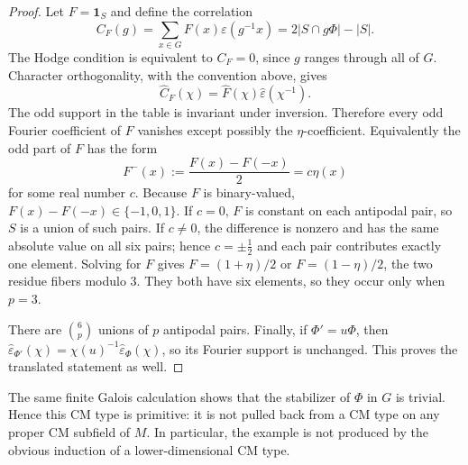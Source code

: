 \begin{proof}
Let $F=\mathbf1_S$ and define the correlation
\[
 C_F(g)=\sum_{x\in G}F(x)\varepsilon(g^{-1}x)
       =2|S\cap g\Phi|-|S|.
\]
The Hodge condition is equivalent to $C_F=0$, since $g$ ranges through all
of $G$.  Character orthogonality, with the convention above, gives
\[
 \widehat C_F(\chi)=\widehat F(\chi)
                    \widehat\varepsilon(\chi^{-1}).
\]
The odd support in the table is invariant under inversion.  Therefore every
odd Fourier coefficient of $F$ vanishes except possibly the $\eta$-coefficient.
Equivalently the odd part of $F$ has the form
\[
 F^-(x):=\frac{F(x)-F(-x)}2=c\eta(x)
\]
for some real number $c$.  Because $F$ is binary-valued,
$F(x)-F(-x)\in\{-1,0,1\}$.  If $c=0$, $F$ is constant on each antipodal
pair, so $S$ is a union of such pairs.  If $c\ne0$, the difference is nonzero
and has the same absolute value on all six pairs; hence $c=\pm\tfrac12$ and
each pair contributes exactly one element.  Solving for $F$ gives
$F=(1+\eta)/2$ or $F=(1-\eta)/2$, the two residue fibers modulo $3$.
They both have six elements, so they occur only when $p=3$.

There are $\binom6p$ unions of $p$ antipodal pairs.  Finally, if
$\Phi'=u\Phi$, then
$\widehat\varepsilon_{\Phi'}(\chi)=\chi(u)^{-1}
\widehat\varepsilon_\Phi(\chi)$, so its Fourier support is unchanged.  This
proves the translated statement as well.
\end{proof}

The same finite Galois calculation shows that the stabilizer of $\Phi$ in $G$ is trivial.  Hence this CM type is primitive: it is not pulled back from a CM type on any proper CM subfield of $M$.  In particular, the example is not produced by the obvious induction of a lower-dimensional CM type.

